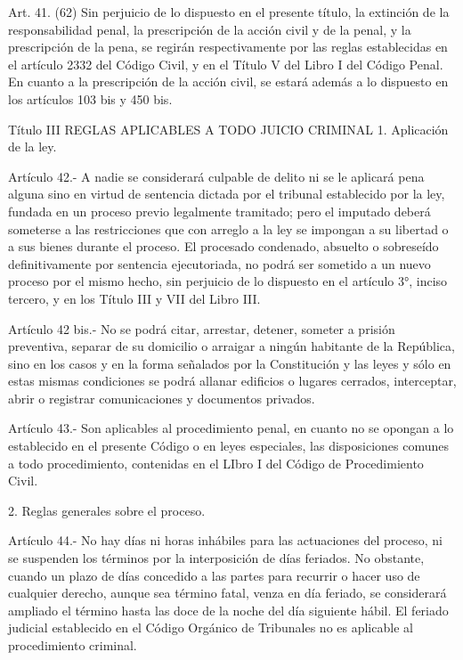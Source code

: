     Art. 41. (62) Sin perjuicio de lo dispuesto en el presente título, la extinción de la responsabilidad penal, la prescripción de la acción civil y de la penal, y la prescripción de la pena, se regirán respectivamente por las reglas establecidas en el artículo 2332 del Código Civil, y en el Título V del Libro I del Código Penal.
    En cuanto a la prescripción de la acción civil, se estará además a lo dispuesto en los artículos 103 bis y 450 bis.


  Título III
  REGLAS APLICABLES A TODO JUICIO CRIMINAL
  1. Aplicación de la ley.


    Artículo 42.- A nadie se considerará culpable de delito ni se le aplicará pena alguna sino en virtud de sentencia dictada por el tribunal establecido por la ley, fundada en un proceso previo legalmente tramitado; pero el imputado deberá someterse a las restricciones que con arreglo a la ley se impongan a su libertad o a sus bienes durante el proceso.
    El procesado condenado, absuelto o sobreseído definitivamente por sentencia ejecutoriada, no podrá ser sometido a un nuevo proceso por el mismo hecho, sin perjuicio de lo dispuesto en el artículo 3°, inciso tercero, y en los Título III y VII del Libro III.


    Artículo 42 bis.- No se podrá citar, arrestar, detener, someter a prisión preventiva, separar de su domicilio o arraigar a ningún habitante de la República, sino en los casos y en la forma señalados por la Constitución y las leyes y sólo en estas mismas condiciones se podrá allanar edificios o lugares cerrados, interceptar, abrir o registrar comunicaciones y documentos privados.

    Artículo 43.- Son aplicables al procedimiento penal, en cuanto no se opongan a lo establecido en el presente Código o en leyes especiales, las disposiciones comunes a todo procedimiento, contenidas en el LIbro I del Código de Procedimiento Civil.

  2. Reglas generales sobre el proceso.


    Artículo 44.- No hay días ni horas inhábiles para las actuaciones del proceso, ni se suspenden los términos por la interposición de días feriados. No obstante, cuando un plazo de días concedido a las partes para recurrir o hacer uso de cualquier derecho, aunque sea término fatal, venza en día feriado, se considerará ampliado el término hasta las doce de la noche del día siguiente hábil.
    El feriado judicial establecido en el Código Orgánico de Tribunales no es aplicable al procedimiento criminal.





